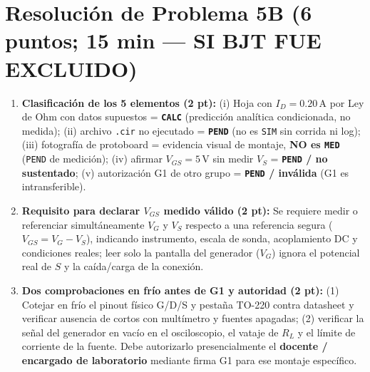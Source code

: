 \documentclass[11pt, a4paper]{article}
\begin{document}
\section*{Resolución de Problema 5B (6 puntos; 15 min — SI BJT FUE EXCLUIDO)}
\begin{enumerate}[label=\arabic*., noitemsep, topsep=2pt]
    \item \textbf{Clasificación de los 5 elementos (2 pt):} (i) Hoja con $I_D = 0.20\,\text{A}$ por Ley de Ohm con datos supuestos = \textbf{\texttt{CALC}} (predicción analítica condicionada, no medida); (ii) archivo \texttt{.cir} no ejecutado = \textbf{\texttt{PEND}} (no es \texttt{SIM} sin corrida ni log); (iii) fotografía de protoboard = evidencia visual de montaje, \textbf{NO es \texttt{MED}} (\texttt{PEND} de medición); (iv) afirmar $V_{GS}=5\,\text{V}$ sin medir $V_S$ = \textbf{\texttt{PEND} / no sustentado}; (v) autorización G1 de otro grupo = \textbf{\texttt{PEND} / inválida} (G1 es intransferible).
    \item \textbf{Requisito para declarar $V_{GS}$ medido válido (2 pt):} Se requiere medir o referenciar simultáneamente $V_G$ y $V_S$ respecto a una referencia segura ($V_{GS} = V_G - V_S$), indicando instrumento, escala de sonda, acoplamiento DC y condiciones reales; leer solo la pantalla del generador ($V_G$) ignora el potencial real de $S$ y la caída/carga de la conexión.
    \item \textbf{Dos comprobaciones en frío antes de G1 y autoridad (2 pt):} (1) Cotejar en frío el pinout físico G/D/S y pestaña TO-220 contra datasheet y verificar ausencia de cortos con multímetro y fuentes apagadas; (2) verificar la señal del generador en vacío en el osciloscopio, el vataje de $R_L$ y el límite de corriente de la fuente. Debe autorizarlo presencialmente el \textbf{docente / encargado de laboratorio} mediante firma G1 para ese montaje específico.
\end{enumerate}
\end{document}
